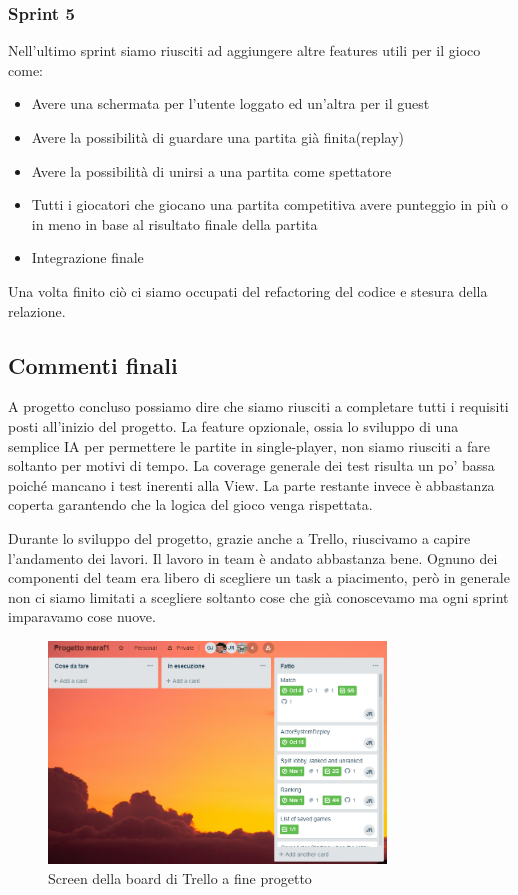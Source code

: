 \subsubsection{Sprint 5}
Nell’ultimo sprint siamo riusciti ad aggiungere altre features utili per il gioco come: 
 \begin {itemize}
  \item Avere una schermata per l’utente loggato ed un’altra per il guest
  \item Avere la possibilità di guardare una partita già finita(replay)
  \item Avere la possibilità di unirsi a una partita come spettatore
  \item Tutti i giocatori che giocano una partita competitiva avere punteggio in più o in meno in base al risultato finale della partita
  \item Integrazione finale
\end {itemize} 

Una volta finito ciò ci siamo occupati del refactoring del codice e stesura della relazione.
\bigskip
\subsection{Commenti finali}

A progetto concluso possiamo dire che siamo riusciti a completare tutti i requisiti posti all’inizio del progetto. La feature opzionale, ossia lo sviluppo di una semplice IA per permettere le partite in single-player, non siamo riusciti a fare soltanto per motivi di tempo. 
La coverage generale dei test risulta un po’ bassa poiché mancano i test inerenti alla View. La parte restante invece è abbastanza coperta garantendo che la logica del gioco venga rispettata.

Durante lo sviluppo del progetto, grazie anche a Trello, riuscivamo a capire l’andamento dei lavori. Il lavoro in team è andato abbastanza bene. Ognuno dei componenti del team era libero di scegliere un task a piacimento, però in generale non ci siamo limitati a scegliere soltanto cose che già conoscevamo ma ogni sprint imparavamo cose nuove. 

\begin{figure}[h!]
 \centering
  \includegraphics[width=0.8\textwidth]{trello.png}
   \caption{Screen della board di Trello a fine progetto }
\end{figure}


